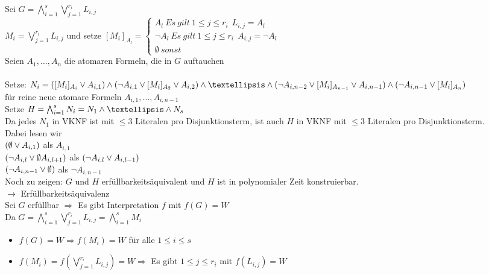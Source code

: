 \beweis{}
Sei $G = \bigwedge_{i=1}^s \bigvee_{j=1}^{r_i} L_{i,j}$\\
$M_i = \bigvee_{j=1}^{r_i} L_{i,j}$ und setze $[M_i]_{A_l} = \begin{cases} A_l\ Es\ gilt\ 1 \leq j \leq r_i\ \ L_{i,j} = A_l \\ 
\neg A_l\ Es\ gilt\ 1 \leq j \leq r_i\ \ A_{i,j} = \neg A_l \\ \emptyset\ sonst \end{cases}$\\
Seien $A_1, …, A_n$ die atomaren Formeln, die in $G$ auftauchen\\

\noindent\\
Setze: $N_i = ( [M_i]_{A_i} \OR A_{i,1} )  \AND ( \neg A_{i,1} \OR [M_i]_{A_2} \OR A_{i,2} ) \AND … \AND ( \neg A_{i,n-2} \OR [M_i]_{A_{n-1}} \OR A_{i,n-1}) \AND ( \neg A_{i, n-1} \OR [M_i]_{A_n})$\\
für reine neue atomare Formeln $A_{i,1}, …, A_{i,n-1}$\\
Setze $H = \bigwedge_{i=1}^s N_i = N_1 \AND … \AND N_s$\\
Da jedes $N_1$ in VKNF ist mit $\leq 3$ Literalen pro Disjunktionsterm, ist auch $H$ in VKNF mit $\leq 3$ Literalen pro Disjunktionsterm.\\

\noindent
Dabei lesen wir\\
$( \emptyset \vee A_{i,1})$ als $A_{i,1}$\\
$( \neg A_{i,l} \vee \emptyset A_{i,l+1})$ als $( \neg A_{i.l} \vee A_{i,l-1})$\\
$(\neg A_{i,n-1} \vee \emptyset)$ als $\neg A_{i,n-1}$\\

\noindent
Noch zu zeigen: $G$ und $H$ erfüllbarkeitsäquivalent und $H$ ist in polynomialer Zeit konstruierbar.\\
$\rightarrow$ Erfüllbarkeitsäquivalenz\\
Sei $G$ erfüllbar $\Rightarrow$ Es gibt Interpretation $f$ mit $f(G) = W$\\
Da $G = \bigwedge_{i=1}^s \bigvee_{j=1}^{r_i} L_{i,j} = \bigwedge_{i=1}^s M_i$
\begin{itemize}
\item $f(G) = W \Rightarrow f(M_i) = W$ für alle $1 \leq i \leq s$
\item $f(M_i) = f( \bigvee_{j=1}^{r_i} L_{i,j}) = W \Rightarrow$ Es gibt $1 \leq j \leq r_i$ mit $f(L_{i,j}) = W$
\end{itemize}

